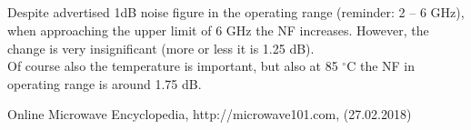 \documentclass[eng,printmode]{mgr}
\begin{document}
\subsection*{}
Despite advertised 1dB noise figure in the operating range (reminder: 2 -- 6 GHz), when approaching the upper limit of 6 GHz the NF increases. However, the change is very insignificant (more or less it is 1.25 dB).\\
Of course also the temperature is important, but also at 85 $^\circ$C
the NF in operating range is around 1.75 dB.
\begin{thebibliography}{9}
 Online Microwave Encyclopedia, http://microwave101.com,  (27.02.2018)
\end{thebibliography}
	
\end{document}
